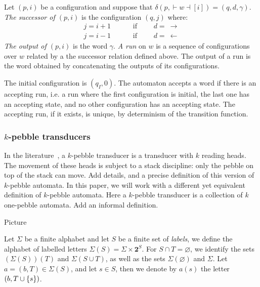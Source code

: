 Let $(p,i)$ be a configuration and suppose that $\delta(p, {\vdash} w{\dashv}[i])=(q,d,\gamma)$. \emph{The successor of $(p,i)$} is the configuration $(q,j)$
where:
\begin{align*}
 j=i+1 &\qquad \text{ if }\qquad d=\ \rightarrow\\
 j=i-1 &\qquad \text{ if }\qquad d=\ \leftarrow 
\end{align*}
\emph{The output of $(p,i)$} is the word $\gamma$. \emph{A run} on $w$ is a sequence of configurations over $w$ related by a the successor relation defined above. The output of a run is the word obtained by concatenating the outputs of its configurations.


The initial configuration is $(q_I, 0)$. The automaton accepts a word if there is an accepting run,
i.e. a run where the first configuration is initial, the last one has an accepting
state, and no other configuration has an accepting state. The accepting run, if it exists, is unique, by determinism of the transition function.


\subsubsection{$k$-pebble transducers}

In the literature~\cite{}, a $k$-pebble transducer is a transducer with $k$ reading heads. The movement of these heads is subject to a stack discipline: only the pebble on top of the stack can move. Add details, and a precise definition of this version of $k$-pebble automata. 
In this paper, we will work with a different yet equivalent definition of $k$-pebble automata. Here a $k$-pebble transducer is a collection of $k$ one-pebble automata. Add an informal definition.
\begin{center}
Picture
\end{center}
Let $\Sigma$ be a finite alphabet and let $S$ be a finite set of \emph{labels}, we define the alphabet of labelled letters $\Sigma(S)=\Sigma\times \mathbf 2^S$. For $S\cap T=\varnothing$, we identify the sets $(\Sigma(S))(T)$ and $\Sigma(S\cup T)$, as well as the sets $\Sigma(\varnothing)$ and $\Sigma$.
Let $a=(b,T)\in \Sigma(S)$, and let $s\in S$, then we denote by  $a(s)$ the letter $(b,T\cup\{s\})$.

